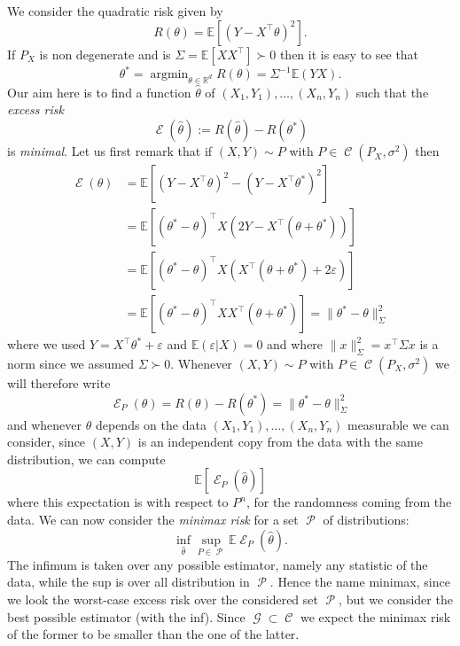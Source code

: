 \documentclass[
	fontsize=11pt, %
	twoside=false, %
	numbers=noenddot, %
]{kaobook}
\DeclareMathOperator{\cC}{{\mathcal C}}
\DeclareMathOperator{\cE}{{\mathcal E}}
\DeclareMathOperator{\cG}{{\mathcal G}}
\DeclareMathOperator{\cP}{{\mathcal P}}
\DeclareMathOperator*{\argmin}{argmin}
\newcommand{\eps}{\varepsilon}
\newcommand{\E}{\mathbb E}
\newcommand{\R}{\mathbb R}
\newcommand{\wh}{\widehat}
\newcommand{\norm}[1]{\| #1 \|}
\begin{document}
We consider the quadratic risk  given by
\begin{equation*}
	R(\theta) = \E [ (Y - X^\top \theta)^2].
\end{equation*}
If $P_X$ is non degenerate and is $\Sigma = \E[ X X^\top] \succ 0$ then it is easy to see that
\begin{equation*}
	\theta^* = \argmin_{\theta \in \R^d} R(\theta) = \Sigma^{-1} \E(Y X).
\end{equation*}
Our aim here is to find a function $\wh \theta$ of $(X_1, Y_1), \ldots, (X_n, Y_n)$ such that the \emph{excess risk}
\begin{equation*}
	\cE(\wh \theta) := R(\wh \theta) - R(\theta^*)
\end{equation*}
is \emph{minimal}.
Let us first remark that if $(X, Y) \sim P$ with $P \in \cC(P_X, \sigma^2)$ then
\begin{align*}
	\cE(\theta) &= \E [ (Y - X^\top  \theta)^2 - (Y - X^\top \theta^*)^2] \\
	&= \E [ (\theta^* - \theta)^\top X (2 Y - X^\top (\theta + \theta^*))] \\
	&= \E [ (\theta^* - \theta)^\top X (X^\top (\theta + \theta^*) + 2 \eps)] \\
	&= \E [ (\theta^* - \theta)^\top X X^\top (\theta + \theta^*)] = \norm{\theta^* - \theta}_\Sigma^2
\end{align*}
where we used $Y = X^\top \theta^* + \eps$ and $\E(\eps | X) = 0$ and where $\norm{x}_\Sigma^2 = x^\top \Sigma x$ is a norm since we assumed $\Sigma \succ 0$.
Whenever $(X, Y) \sim P$ with $P \in \cC(P_X, \sigma^2)$ we will therefore write
\begin{equation*}
	\cE_P(\theta) = R(\theta) - R(\theta^*) = \norm{\theta^* - \theta}_\Sigma^2
\end{equation*}
and whenever $\wh \theta$ depends on the data $(X_1, Y_1), \ldots, (X_n, Y_n)$ measurable we can consider, since $(X, Y)$ is an independent copy from the data with the same distribution, we can compute
\begin{equation*}
	\E [ \cE_P(\wh \theta) ]
\end{equation*}
where this expectation is with respect to $P^n$, for the randomness coming from the data. We can now consider the \emph{minimax risk} for a set $\cP$ of distributions:
\begin{equation*}
	\inf_{\wh \theta} \sup_{P \in \cP} \E \cE_P(\wh \theta).
\end{equation*}
The infimum is taken over any possible estimator, namely any statistic of the data, while the sup is over all distribution in $\cP$. Hence the name minimax, since we look the worst-case excess risk over the considered set $\cP$, but we consider the best possible estimator (with the inf).
Since $\cG \subset \cC$ we expect the minimax risk of the former to be smaller than the one of the latter.
\end{document}
